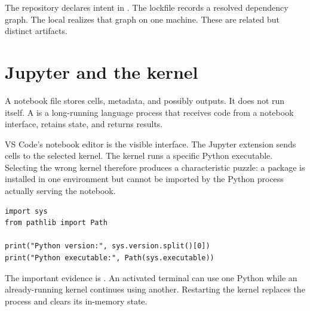 The repository declares intent in . The lockfile records a
resolved dependency graph. The local  realizes that graph on one
machine. These are related but distinct artifacts.

\begin{center}
\end{center}

\section{Jupyter and the kernel}

A notebook file stores cells, metadata, and possibly outputs. It does not run
itself. A  is a long-running language process that receives code
from a notebook interface, retains state, and returns results.

VS Code's notebook editor is the visible interface. The Jupyter extension sends
cells to the selected kernel. The kernel runs a specific Python executable.
Selecting the wrong kernel therefore produces a characteristic puzzle: a
package is installed in one environment but cannot be imported by the Python
process actually serving the notebook.

\begin{lstlisting}[caption={Inspect the Python process serving a notebook.}]
import sys
from pathlib import Path

print("Python version:", sys.version.split()[0])
print("Python executable:", Path(sys.executable))
\end{lstlisting}

The important evidence is . An activated terminal can use
one Python while an already-running kernel continues using another. Restarting
the kernel replaces the process and clears its in-memory state.

